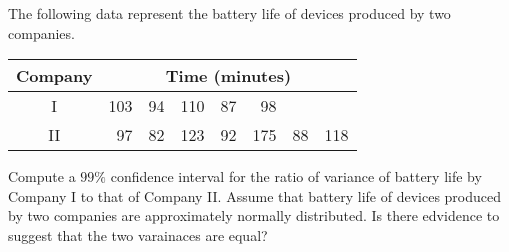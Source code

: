 \documentclass[letterpaper,10pt,addpoints]{exam}
\begin{document}
\begin{questions}

\question[10]
The following data represent the battery life of devices produced by two companies.

\begin{tabular}{c|rrrrrrr} 
Company & \multicolumn{7}{|c}{ Time (minutes) } \\
\hline I & 103 & 94 & 110 & 87 & 98 & \\
II & 97 & 82 & 123 & 92 & 175 & 88 & 118
\end{tabular}

Compute a $99 \%$ confidence interval for the ratio of variance of battery life by Company I to that of Company II. Assume that battery life of devices produced by two companies are approximately normally distributed. Is there edvidence to suggest that the two varainaces are equal?


\end{questions}
\end{document}
